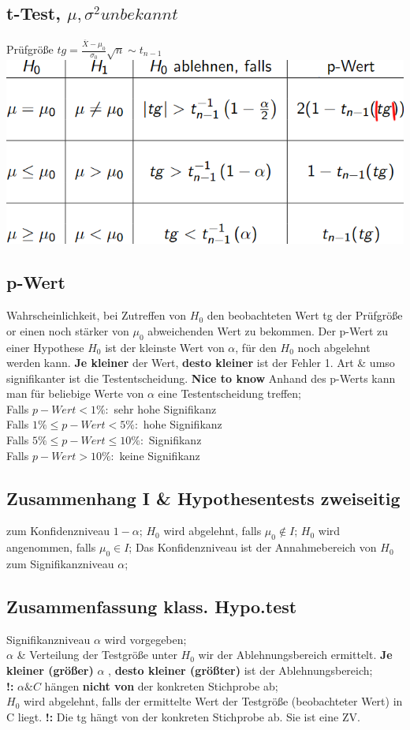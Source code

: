 \subsection{t-Test, $ \mu, \sigma^2 unbekannt  $}
Prüfgröße $ tg = \frac{ \overline{X} -\mu_{0} }{ \sigma_{0} } \sqrt{n} \sim t_{n-1} $
\includegraphics[scale=0.25]{./pic/tTest.png}
\subsection{p-Wert}
Wahrscheinlichkeit, bei Zutreffen von $ H_{0} $ den beobachteten Wert tg der Prüfgröße or einen noch stärker von $ \mu_{0} $ abweichenden Wert zu bekommen.
Der p-Wert zu einer Hypothese $ H_{0} $ ist der kleinste Wert von $ \alpha $, für den $ H_{0} $ noch abgelehnt werden kann. \textbf{Je kleiner} der Wert, \textbf{desto kleiner} ist der Fehler 1. Art \& umso signifikanter ist die Testentscheidung. 
\textbf{Nice to know} Anhand des p-Werts kann man für beliebige Werte von $ \alpha $ eine Testentscheidung treffen;\\
Falls $ p-Wert < 1\%:$ sehr hohe Signifikanz\\
Falls $ 1\% \le p-Wert < 5\%: $ hohe Signifikanz\\
Falls $ 5\% \le p-Wert \le 10\%: $ Signifikanz\\
Falls $ p-Wert > 10\%: $ keine Signifikanz\\
\subsection{Zusammenhang I \& Hypothesentests zweiseitig}
zum Konfidenzniveau $ 1- \alpha $; 
$ H_{0} $ wird abgelehnt, falls $ \mu_{0} \notin I $; 
$ H_{0} $ wird angenommen, falls $ \mu_{0} \in I $; 
Das Konfidenzniveau ist der Annahmebereich von $ H_{0} $ zum Signifikanzniveau $ \alpha $; 
\subsection{Zusammenfassung klass. Hypo.test}
Signifikanzniveau $ \alpha $ wird vorgegeben;\\
$ \alpha $ \& Verteilung der Testgröße unter $ H_{0} $ wir der Ablehnungsbereich ermittelt. \textbf{Je kleiner (größer) } $ \alpha $ , \textbf{desto kleiner (größter) } ist der Ablehnungsbereich; \\
\textbf{!:} $ \alpha \& C $  hängen \textbf{nicht von} der konkreten Stichprobe ab;\\
$ H_{0} $ wird abgelehnt, falls der ermittelte Wert der Testgröße (beobachteter Wert) in C liegt. 
\textbf{!:} Die tg hängt von der konkreten Stichprobe ab. Sie ist eine ZV.

